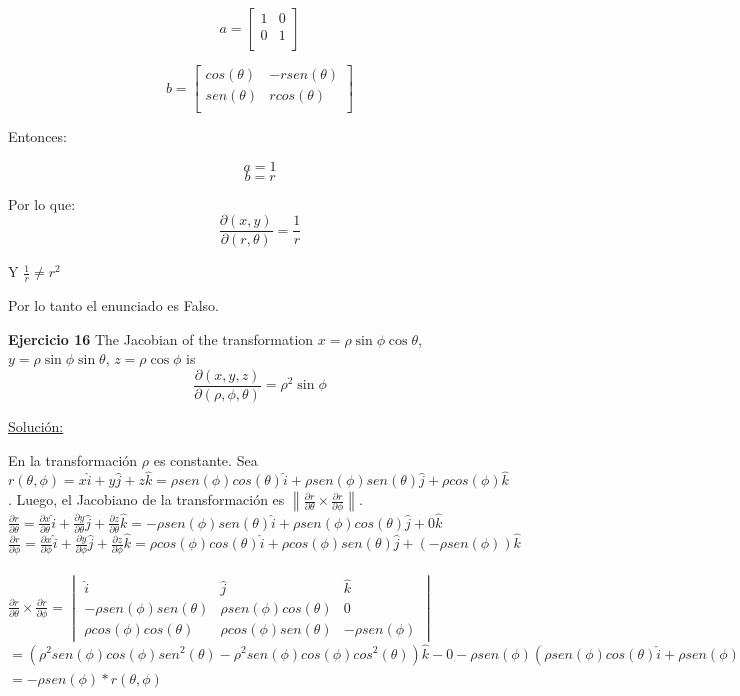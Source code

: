 \documentclass{report}
\newcommand{\s}{\underline{Soluci\'{o}n:}}
\begin{document}
	\[a =  \begin{bmatrix}
	1 & 0  \\
	0 & 1 \\
	\end{bmatrix} \]
	
	\[ b = \begin{bmatrix}
	cos(\theta) & -rsen(\theta)  \\
	sen(\theta) &  rcos(\theta)\\
	\end{bmatrix} \]
	
	Entonces:
	
	\[ a = 1 \]
	\[ b = r \]
	
	Por lo que:
	\[\frac{\partial(x,y)}{\partial(r, \theta)} = \frac{1}{r} \]
	
	Y $ \frac{1}{r} \neq  r^2$
	
	Por lo tanto el enunciado es Falso.
	
	\textbf{Ejercicio 16}
	The Jacobian of the transformation $x = \rho \sin \phi \cos \theta$,$
	y = \rho \sin \phi \sin \theta$, $z = \rho \cos \phi$ is
	\[\frac{\partial(x, y, z)}{\partial(\rho, \phi, \theta)} = \rho^2\sin\phi\]
	
	\s 
	
	En la transformación $\rho$ es constante. 
	Sea $r(\theta, \phi)= x\hat{i}+y\hat{j}+z\hat{k}=\rho sen(\phi) cos(\theta) \hat{i} + \rho sen(\phi) sen(\theta) \hat{j} + \rho cos(\phi) \hat{k}$ . Luego, el Jacobiano de la transformación es $\left \| \frac{\partial r}{\partial \theta} \times \frac{\partial r}{\partial \phi}\right \|$.\\
	
	$\frac{\partial r}{\partial \theta}=\frac{\partial x}{\partial \theta}\hat{i}+\frac{\partial y}{\partial \theta}\hat{j}+\frac{\partial z}{\partial \theta}\hat{k}= -\rho sen(\phi)sen(\theta)\hat{i} + \rho sen(\phi)cos(\theta)\hat{j}+ 0\hat{k}$\\
	
	$\frac{\partial r}{\partial \phi}=\frac{\partial x}{\partial \phi}\hat{i}+\frac{\partial y}{\partial \phi}\hat{j}+\frac{\partial z}{\partial \phi}\hat{k}= \rho cos(\phi)cos(\theta)\hat{i} +  \rho cos(\phi)sen(\theta)\hat{j}+ (-\rho sen(\phi))\hat{k}$\\
	\\
	$\frac{\partial r}{\partial \theta} \times \frac{\partial r}{\partial \phi}=\begin{vmatrix}
	\hat{i} & \hat{j} & \hat{k}\\ 
	-\rho sen(\phi)sen(\theta) & \rho sen(\phi)cos(\theta) & 0\\ 
	\rho cos(\phi)cos(\theta) & \rho cos(\phi)sen(\theta) & -\rho sen(\phi)
	\end{vmatrix}$\\$=(\rho ^2 sen(\phi)cos(\phi)sen^2(\theta)-\rho ^2sen(\phi)cos(\phi)cos^2(\theta))\hat{k}-0-\rho sen(\phi)(\rho sen(\phi)cos(\theta)\hat{i}+\rho sen(\phi)sen(\theta)\hat{j})=-\rho sen(\phi)(\rho sen(\phi)cos(\theta)\hat{i}+\rho sen(\theta)sen(\phi)\hat{j}+\rho cos(\phi)\hat{k})$\\$=-\rho sen(\phi)*r(\theta,\phi)$\\
	
\end{document}
